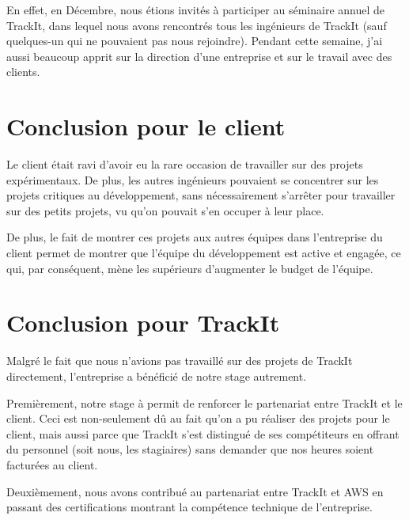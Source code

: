 \begin{flushleft}
  En effet, en Décembre, nous étions invités à participer au
  séminaire annuel de TrackIt, dans lequel nous avons rencontrés
  tous les ingénieurs de TrackIt (sauf quelques-un qui ne pouvaient
  pas nous rejoindre). Pendant cette semaine, j'ai aussi beaucoup
  apprit sur la direction d'une entreprise et sur le travail avec
  des clients.
\end{flushleft}

\section{Conclusion pour le client}

\begin{flushleft}
  Le client était ravi d'avoir eu la rare occasion de
  travailler sur des projets expérimentaux. De plus,
  les autres ingénieurs pouvaient se concentrer sur les
  projets critiques au développement, sans nécessairement
  s'arrêter pour travailler sur des petits projets, vu qu'on
  pouvait s'en occuper à leur place.
\end{flushleft}

\begin{flushleft}
  De plus, le fait de montrer ces projets aux autres
  équipes dans l'entreprise du client permet de montrer
  que l'équipe du développement est active et engagée,
  ce qui, par conséquent, mène les supérieurs d'augmenter
  le budget de l'équipe.
\end{flushleft}

\section{Conclusion pour TrackIt}

\begin{flushleft}
  Malgré le fait que nous n'avions pas travaillé
  sur des projets de TrackIt directement, l'entreprise
  a bénéficié de notre stage autrement.
\end{flushleft}

\begin{flushleft}
  Premièrement, notre stage à permit de renforcer le partenariat
  entre TrackIt et le client. Ceci est non-seulement dû au fait
  qu'on a pu réaliser des projets pour le client, mais aussi
  parce que TrackIt s'est distingué de ses compétiteurs en
  offrant du personnel (soit nous, les stagiaires) sans demander
  que nos heures soient facturées au client.
\end{flushleft}

\begin{flushleft}
  Deuxièmement, nous avons contribué au partenariat entre TrackIt
  et AWS en passant des certifications montrant la compétence
  technique de l'entreprise.
\end{flushleft}
